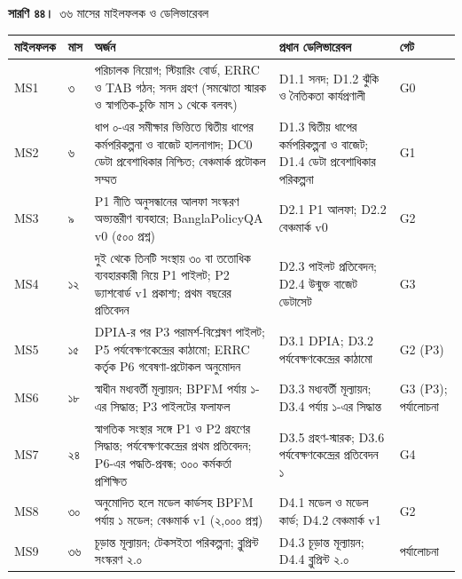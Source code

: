 \documentclass[border=10pt]{standalone}
\begin{document}
\begin{minipage}{17cm}
{\large\bfseries সারণি ৪৪।}\ {\large ৩৬ মাসের মাইলফলক ও ডেলিভারেবল}\par\vspace{7pt}
\small
{}
\begin{tabularx}{\linewidth}{@{}>{\hsize=0.517\hsize\raggedright\arraybackslash}X>{\hsize=0.460\hsize\raggedright\arraybackslash}X>{\hsize=2.299\hsize\raggedright\arraybackslash}X>{\hsize=1.264\hsize\raggedright\arraybackslash}X>{\hsize=0.460\hsize\raggedright\arraybackslash}X@{}}
\arrayrulecolor{bapilrule}\toprule
\rowcolor{white}\textbf{মাইলফলক} & \textbf{মাস} & \textbf{অর্জন} & \textbf{প্রধান ডেলিভারেবল} & \textbf{গেট} \\
\midrule
MS1 & ৩ & পরিচালক নিয়োগ; স্টিয়ারিং বোর্ড, ERRC ও TAB গঠন; সনদ গ্রহণ (সমঝোতা স্মারক ও স্বাগতিক-চুক্তি মাস ১ থেকে বলবৎ) & D1.1 সনদ; D1.2 ঝুঁকি ও নৈতিকতা কার্যপ্রণালী & G0 \\
MS2 & ৬ & ধাপ ০-এর সমীক্ষার ভিত্তিতে দ্বিতীয় ধাপের কর্মপরিকল্পনা ও বাজেট হালনাগাদ; DC0 ডেটা প্রবেশাধিকার নিশ্চিত; বেঞ্চমার্ক প্রটোকল সম্মত & D1.3 দ্বিতীয় ধাপের কর্মপরিকল্পনা ও বাজেট; D1.4 ডেটা প্রবেশাধিকার পরিকল্পনা & G1 \\
MS3 & ৯ & P1 নীতি অনুসন্ধানের আলফা সংস্করণ অভ্যন্তরীণ ব্যবহারে; BanglaPolicyQA v0 (৫০০ প্রশ্ন) & D2.1 P1 আলফা; D2.2 বেঞ্চমার্ক v0 & G2 \\
MS4 & ১২ & দুই থেকে তিনটি সংস্থায় ৩০ বা ততোধিক ব্যবহারকারী নিয়ে P1 পাইলট; P2 ড্যাশবোর্ড v1 প্রকাশ্য; প্রথম বছরের প্রতিবেদন & D2.3 পাইলট প্রতিবেদন; D2.4 উন্মুক্ত বাজেট ডেটাসেট & G3 \\
MS5 & ১৫ & DPIA-র পর P3 পরামর্শ-বিশ্লেষণ পাইলট; P5 পর্যবেক্ষণকেন্দ্রের কাঠামো; ERRC কর্তৃক P6 গবেষণা-প্রটোকল অনুমোদন & D3.1 DPIA; D3.2 পর্যবেক্ষণকেন্দ্রের কাঠামো & G2 (P3) \\
MS6 & ১৮ & স্বাধীন মধ্যবর্তী মূল্যায়ন; BPFM পর্যায় ১-এর সিদ্ধান্ত; P3 পাইলটের ফলাফল & D3.3 মধ্যবর্তী মূল্যায়ন; D3.4 পর্যায় ১-এর সিদ্ধান্ত & G3 (P3); পর্যালোচনা \\
MS7 & ২৪ & স্বাগতিক সংস্থার সঙ্গে P1 ও P2 গ্রহণের সিদ্ধান্ত; পর্যবেক্ষণকেন্দ্রের প্রথম প্রতিবেদন; P6-এর পদ্ধতি-প্রবন্ধ; ৩০০ কর্মকর্তা প্রশিক্ষিত & D3.5 গ্রহণ-স্মারক; D3.6 পর্যবেক্ষণকেন্দ্রের প্রতিবেদন ১ & G4 \\
MS8 & ৩০ & অনুমোদিত হলে মডেল কার্ডসহ BPFM পর্যায় ১ মডেল; বেঞ্চমার্ক v1 (২,০০০ প্রশ্ন) & D4.1 মডেল ও মডেল কার্ড; D4.2 বেঞ্চমার্ক v1 & G2 \\
MS9 & ৩৬ & চূড়ান্ত মূল্যায়ন; টেকসইতা পরিকল্পনা; ব্লুপ্রিন্ট সংস্করণ ২.০ & D4.3 চূড়ান্ত মূল্যায়ন; D4.4 ব্লুপ্রিন্ট ২.০ & পর্যালোচনা \\
\bottomrule
\end{tabularx}
\par\vspace{5pt}{\footnotesize\itshape মাস ১ হলো প্রথম সেই মাস, যখন সমঝোতা স্মারক, স্বাগতিক-চুক্তি ও প্রথম বছরের অর্থায়ন তিনটিই নিশ্চিত (সংযুক্তি ন), প্রায় ছয় মাসের প্রস্তুতিমূলক ধাপ ০-এর পরে; ২০২৭-২৮ অর্থবছরের শুরু, জুলাই ২০২৭, সবচেয়ে আগের সম্ভাব্য সূচনা।}
\par{}
\end{minipage}
\end{document}
